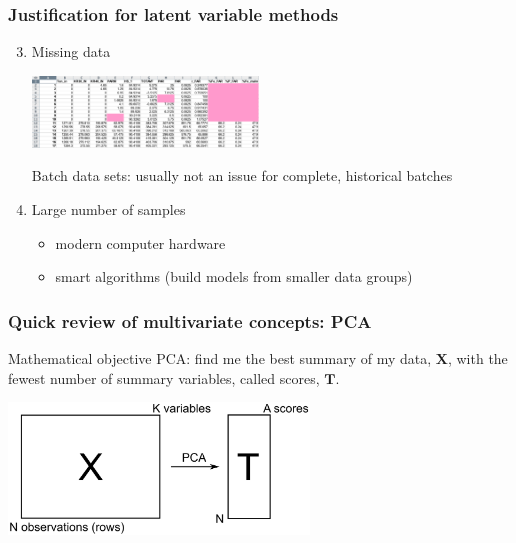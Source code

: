 \begin{frame}\frametitle{Justification for latent variable methods}

\begin{enumerate}
	\setcounter{enumi}{2}
	\item	Missing data
	
			\begin{center}
				\includegraphics[width=6cm]{images/missing-data.png}
			\end{center}
			
			Batch data sets: usually not an issue for complete, historical batches			
			
	
	\item	Large number of samples
	
			\begin{itemize}
				\item	modern computer hardware
				
				\item	smart algorithms (build models from smaller data groups)
			\end{itemize} 
\end{enumerate}
\end{frame}

\begin{frame}\frametitle{Quick review of multivariate concepts: PCA}

	\begin{block}{Mathematical objective}
		PCA: find me the best summary of my data, \( \mathbf{X} \), with the fewest number of summary variables, called scores, \( \mathbf{T} \).
	\end{block}
	
	\vspace{18pt}

	\begin{center}
		\includegraphics[width=8cm]{images/reduce-data-X-to-scores-T.png}
	\end{center}
	
\end{frame}

